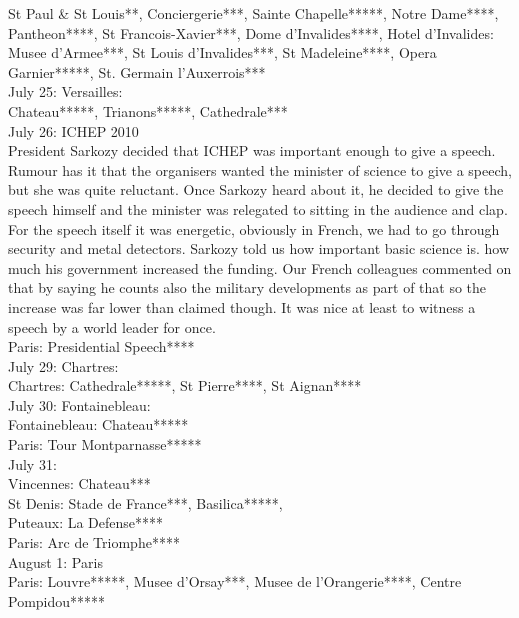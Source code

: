 St Paul \& St Louis**, Conciergerie***, Sainte Chapelle*****, Notre Dame****, Pantheon****, St Francois-Xavier***, Dome d'Invalides****, Hotel d'Invalides: Musee d'Armee***, St Louis d'Invalides***, St Madeleine****, Opera Garnier*****, St. Germain l'Auxerrois***\\

July 25: Versailles:\\
Chateau*****, Trianons*****, Cathedrale***\\

July 26: ICHEP 2010\\
President Sarkozy decided that ICHEP was important enough to give a speech. Rumour has it that the organisers wanted the minister of science to give a speech, but she was quite reluctant. Once Sarkozy heard about it, he decided to give the speech himself and the minister was relegated to sitting in the audience and clap. For the speech itself it was energetic, obviously in French, we had to go through security and metal detectors. Sarkozy told us how important basic science is. how much his government increased the funding. Our French colleagues commented on that by saying he counts also the military developments as part of that so the increase was far lower than claimed though. It was nice at least to witness a speech by a world leader for once.\\

Paris: Presidential Speech****\\

July 29: Chartres:\\
Chartres: Cathedrale*****, St Pierre****, St Aignan****\\

July 30: Fontainebleau:\\
Fontainebleau: Chateau*****\\
Paris: Tour Montparnasse*****\\

July 31: \\
Vincennes: Chateau***\\
St Denis: Stade de France***, Basilica*****,\\
Puteaux: La Defense****\\
Paris: Arc de Triomphe****\\

August 1: Paris\\
Paris: Louvre*****, Musee d'Orsay***, Musee de l'Orangerie****, Centre Pompidou*****\\

